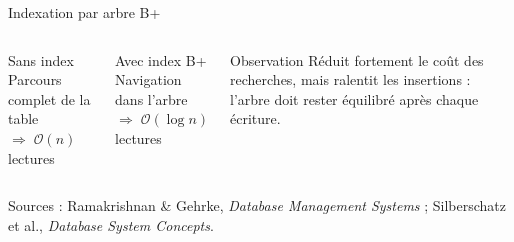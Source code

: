 \documentclass[a4paper,12pt]{beamer}
\begin{document}
\begin{frame}{Indexation par arbre B+}
\begin{columns}[T]
\begin{alertblock}{\footnotesize Sans index}
    \centering\scriptsize
    Parcours complet de la table\\
    $\Rightarrow\;\mathcal{O}(n)$ lectures
\end{alertblock}
\vspace{0.15cm}
\begin{exampleblock}{\footnotesize Avec index B+}
    \centering\scriptsize
    Navigation dans l'arbre\\
    $\Rightarrow\;\mathcal{O}(\log n)$ lectures
\end{exampleblock}

\begin{alertblock}{Observation}
\footnotesize
Réduit fortement le coût des
recherches, mais ralentit les
insertions : l'arbre doit rester
équilibré après chaque écriture.
\end{alertblock}

\end{columns}

\vfill
{\tiny
Sources : Ramakrishnan \& Gehrke, \textit{Database Management Systems} ;
Silberschatz et al., \textit{Database System Concepts}.
}
\end{frame}
\end{document}
